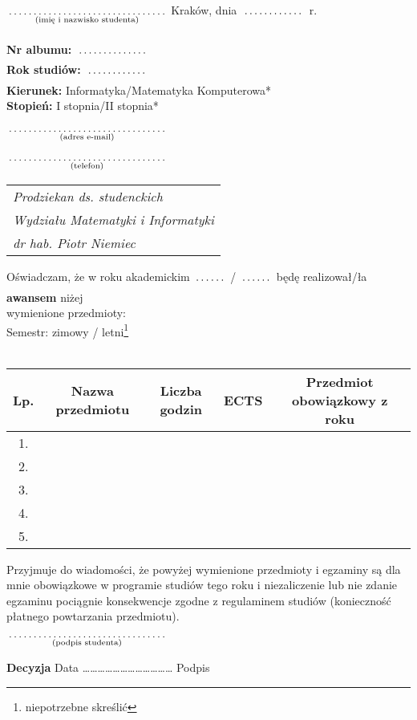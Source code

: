 \documentclass[a4paper,11pt]{article}
\newcommand{\fillField}[2]{
    $\underset{\text{#1}}{\parbox[t]{#2}{\dotfill}}$
}
\begin{document}
\noindent
\fillField{(imię i nazwisko studenta)}{5cm} \hfill Kraków, dnia \fillField{}{2cm} r. \\\\
\textbf{Nr albumu:}   \fillField{}{2.3cm}\\
\textbf{Rok studiów:} \fillField{}{2cm}\\
\textbf{Kierunek:} Informatyka/Matematyka Komputerowa*\\
\textbf{Stopień:} I stopnia/II stopnia*\\\\
\fillField{(adres e-mail)}{5cm}\\\\
\fillField{(telefon)}{5cm}


\phantom{a}\hfill
\begin{tabular}[c]{@{}l@{}}
\textit{Prodziekan ds. studenckich} \\
\textit{Wydziału Matematyki i Informatyki}\\
\textit{dr hab. Piotr Niemiec}
\end{tabular}

\vskip 1.5cm

\noindent
Oświadczam, że w roku akademickim \fillField{}{1cm}/\fillField{}{1cm} będę realizował/ła \textbf{awansem} niżej\\
wymienione przedmioty:\\

\noindent
Semestr: zimowy / letni\footnote[1]{niepotrzebne skreślić}\\\\


\noindent
\begin{tabular}{|c|c|c|c|c|}

    \hline
    \textbf{Lp.} & \textbf{Nazwa przedmiotu} \hspace{0.9cm} & \small{\textbf{Liczba godzin}} & \textbf{ECTS} & \small{\textbf{Przedmiot obowiązkowy z roku}} \\
    \hline
    1.  &   &   &  &\\
    \hline
    2.  &   &   &  &\\
    \hline
    3.  &   &   &  &\\
    \hline
    4.  &   &   &  &\\
    \hline
    5.  &   &   &  &\\
    \hline

\end{tabular}

\vskip 1.6cm

\noindent
Przyjmuje do wiadomości, że powyżej wymienione przedmioty i egzaminy są dla mnie obowiązkowe w programie studiów tego roku i niezaliczenie lub nie zdanie egzaminu pociągnie konsekwencje zgodne z regulaminem studiów (konieczność płatnego powtarzania przedmiotu).\\

\vskip 0.6cm

\hspace{\fill} \fillField{(podpis studenta)}{5cm} \hspace{2.0cm}
\vskip 1.0cm

\noindent
\textbf{Decyzja} \dotfill
\vskip 0.5cm
\noindent
Data ……………………………… Podpis \dotfill
\end{document}
